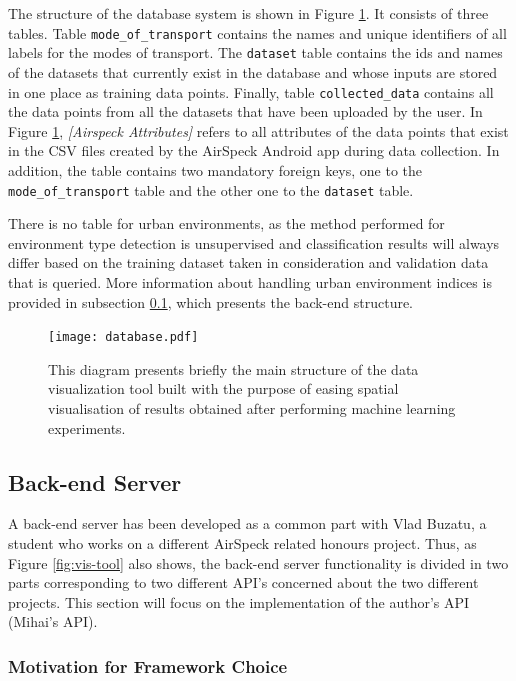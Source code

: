 \documentclass[bsc,frontabs,twoside,singlespacing, parskip,deptreport]{infthesis}     %
\begin{document}
The structure of the database system is shown in Figure \ref{fig:database}. It consists of three tables. Table \texttt{mode\_of\_transport} contains the names and unique identifiers of all labels for the modes of transport. The \texttt{dataset} table contains the ids and names of the datasets that currently exist in the database and whose inputs are stored in one place as training data points. Finally, table \texttt{collected\_data} contains all the data points from all the datasets that have been uploaded by the user. In Figure \ref{fig:database}, \textit{[Airspeck Attributes]} refers to all attributes of the data points that exist in the CSV files created by the AirSpeck Android app during data collection. In addition, the table contains two mandatory foreign keys, one to the \texttt{mode\_of\_transport} table and the other one to the \texttt{dataset} table.

There is no table for urban environments, as the method performed for environment type detection is unsupervised and classification results will always differ based on the training dataset taken in consideration and validation data that is queried. More information about handling urban environment indices is provided in subsection \ref{subsec:back-end}, which presents the back-end structure.

\begin{figure}[h!]
  \center
  \texttt{[image: database.pdf]}
  \caption{This diagram presents briefly the main structure of the data visualization tool built with the purpose of easing spatial visualisation of results obtained after performing machine learning experiments.}
  \label{fig:database}
\end{figure}

\subsection{Back-end Server}
\label{subsec:back-end}

A back-end server has been developed as a common part with Vlad Buzatu, a student who works on a different AirSpeck related honours project. Thus, as Figure \ref{fig:vis-tool} also shows, the back-end server functionality is divided in two parts corresponding to two different API's concerned about the two different projects. This section will focus on the implementation of the author's API (Mihai's API).

\subsubsection*{Motivation for Framework Choice}
\end{document}
